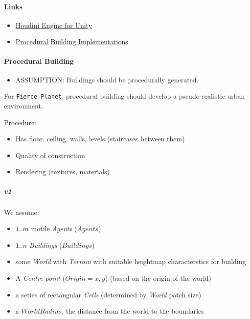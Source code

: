 \documentclass[]{article}
\begin{document}
\paragraph{Links}\label{links-1}

\begin{itemize}
\itemsep1pt\parskip0pt
\item
  \href{http://vimeo.com/88794901}{Houdini Engine for Unity}
\item
  \href{http://vterrain.org/Culture/BldCity/Proc/}{Procedural Building
  Implementations}
\end{itemize}

\paragraph{Procedural Building}\label{procedural-building}

\begin{itemize}
\itemsep1pt\parskip0pt
\item
  ASSUMPTION: Buildings should be procedurally generated.
\end{itemize}

For \texttt{Fierce\ Planet}, procedural building should develop a
pseudo-realistic urban environment.

Procedure:

\begin{itemize}
\itemsep1pt\parskip0pt
\item
  Has floor, ceiling, walls, levels (staircases between them)
\item
  Quality of construction
\item
  Rendering (textures, materials)
\end{itemize}

\subparagraph{v1}\label{v1}

We assume:

\begin{itemize}
\itemsep1pt\parskip0pt
\item
  \(1..m\) motile \emph{Agents} (\(Agents\))
\item
  \(1..n\) \emph{Buildings} (\(Buildings\))
\item
  some \emph{World} with \emph{Terrain} with suitable heightmap
  characterstics for building
\item
  A \emph{Centre point} (\(Origin = {x, y}\)) (based on the origin of
  the world)
\item
  a series of rectangular \emph{Cells} (determined by \emph{World} patch
  size)
\item
  a \(WorldRadius\), the distance from the world to the boundaries
\end{itemize}
\end{document}

